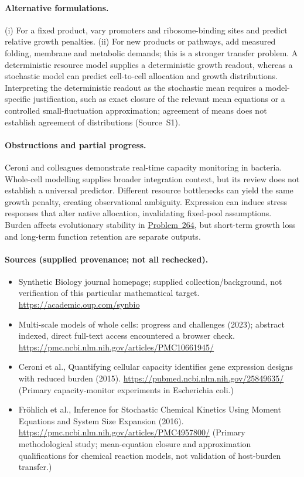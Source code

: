 \documentclass[11pt]{article}
\begin{document}
\paragraph{Alternative formulations.} (i) For a fixed product, vary promoters and ribosome-binding sites and predict relative growth penalties. (ii) For new products or pathways, add measured folding, membrane and metabolic demands; this is a stronger transfer problem. A deterministic resource model supplies a deterministic growth readout, whereas a stochastic model can predict cell-to-cell allocation and growth distributions. Interpreting the deterministic readout as the stochastic mean requires a model-specific justification, such as exact closure of the relevant mean equations or a controlled small-fluctuation approximation; agreement of means does not establish agreement of distributions (Source~S1).

\paragraph{Obstructions and partial progress.} Ceroni and colleagues demonstrate real-time capacity monitoring in bacteria. Whole-cell modelling supplies broader integration context, but its review does not establish a universal predictor. Different resource bottlenecks can yield the same growth penalty, creating observational ambiguity. Expression can induce stress responses that alter native allocation, invalidating fixed-pool assumptions. Burden affects evolutionary stability in \href{https://we-solve.github.io/problems/evolutionary-stability-of-engineered-functions-f94f07de/}{Problem~264}, but short-term growth loss and long-term function retention are separate outputs.

\paragraph{Sources (supplied provenance; not all rechecked).} \begin{itemize}
\item Synthetic Biology journal homepage; supplied collection/background, not verification of this particular mathematical target. \url{https://academic.oup.com/synbio}
\item Multi-scale models of whole cells: progress and challenges (2023); abstract indexed, direct full-text access encountered a browser check. \url{https://pmc.ncbi.nlm.nih.gov/articles/PMC10661945/}
\item Ceroni et al., Quantifying cellular capacity identifies gene expression designs with reduced burden (2015). \url{https://pubmed.ncbi.nlm.nih.gov/25849635/} (Primary capacity-monitor experiments in Escherichia coli.)
\item[S1] Fr\"ohlich et al., Inference for Stochastic Chemical Kinetics Using Moment Equations and System Size Expansion (2016). \url{https://pmc.ncbi.nlm.nih.gov/articles/PMC4957800/} (Primary methodological study; mean-equation closure and approximation qualifications for chemical reaction models, not validation of host-burden transfer.)
\end{itemize}
\end{document}
